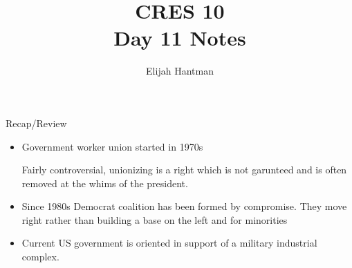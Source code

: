 \documentclass{report}
\title{\Huge{CRES 10}\\Day 11 Notes}
\author{\huge{Elijah Hantman}}
\date{}
\begin{document}
\maketitle
\newpage
\begin{description}
    \item {\large Recap/Review} 
        \begin{itemize}
            \item Government worker union started in 1970s
                
                Fairly controversial, unionizing is a right
                which is not garunteed and is often removed
                at the whims of the president.

            \item Since 1980s Democrat coalition has been
                formed by compromise. They move right rather
                than building a base on the left and for
                minorities

            \item Current US government is oriented in
                support of a military industrial complex.


\end{itemize}
\end{description}
\end{document}
